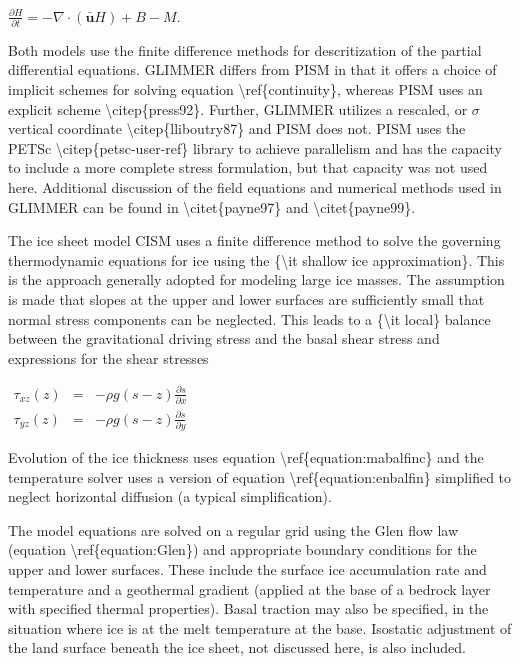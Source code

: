 $
\frac{\partial H}{\partial t} = - \nabla \cdot (\mathbf{\bar u} H) + B - M.
$

Both models use the finite difference methods for descritization of the
partial differential equations. GLIMMER differs from PISM in that it
offers a choice of implicit schemes for solving equation
\textbackslash{}ref\{continuity\}, whereas PISM uses an explicit scheme
\textbackslash{}citep\{press92\}. Further, GLIMMER utilizes a rescaled,
or $\sigma$ vertical coordinate \textbackslash{}citep\{lliboutry87\} and
PISM does not. PISM uses the PETSc
\textbackslash{}citep\{petsc-user-ref\} library to achieve parallelism
and has the capacity to include a more complete stress formulation, but
that capacity was not used here. Additional discussion of the field
equations and numerical methods used in GLIMMER can be found in
\textbackslash{}citet\{payne97\} and \textbackslash{}citet\{payne99\}.

The ice sheet model CISM uses a finite difference method to solve the
governing thermodynamic equations for ice using the \{\textbackslash{}it
shallow ice approximation\}. This is the approach generally adopted for
modeling large ice masses. The assumption is made that slopes at the
upper and lower surfaces are sufficiently small that normal stress
components can be neglected. This leads to a \{\textbackslash{}it
local\} balance between the gravitational driving stress and the basal
shear stress and expressions for the shear stresses

$\begin{matrix}
\tau_{xz}(z)&=&-\rho g \left(s - z \right) \frac{\partial s}{\partial x}  \\
\tau_{yz}(z)&=&-\rho g \left(s - z \right) \frac{\partial s}{\partial y}
\end{matrix}$

Evolution of the ice thickness uses equation
\textbackslash{}ref\{equation:mabalfinc\} and the temperature solver
uses a version of equation \textbackslash{}ref\{equation:enbalfin\}
simplified to neglect horizontal diffusion (a typical simplification).

The model equations are solved on a regular grid using the Glen flow law
(equation \textbackslash{}ref\{equation:Glen\}) and appropriate boundary
conditions for the upper and lower surfaces. These include the surface
ice accumulation rate and temperature and a geothermal gradient (applied
at the base of a bedrock layer with specified thermal properties). Basal
traction may also be specified, in the situation where ice is at the
melt temperature at the base. Isostatic adjustment of the land surface
beneath the ice sheet, not discussed here, is also included.

